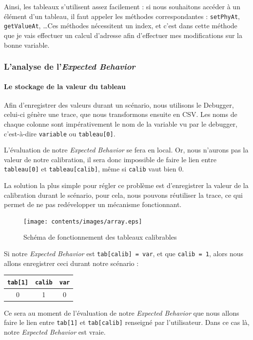 Ainsi, les tableaux s'utilisent assez facilement : si nous souhaitons accéder à un élément d'un tableau, il faut appeler les méthodes correspondantes : \texttt{setPhyAt}, \texttt{getValueAt}, \ldots Ces méthodes nécessitent un index, et c'est dans cette méthode que je vais effectuer un calcul d'adresse afin d'effectuer mes modifications sur la bonne variable.


\subsubsection{L'analyse de l'\textit{Expected Behavior}}


\paragraph{Le stockage de la valeur du tableau} Afin d'enregistrer des valeurs durant un scénario, nous utilisons le Debugger, celui-ci génère une trace, que nous transformons ensuite en CSV. Les noms de chaque colonne sont impérativement le nom de la variable vu par le debugger, c'est-à-dire \texttt{variable} ou \texttt{tableau[0]}.

L'évaluation de notre \textit{Expected Behavior} se fera en local. Or, nous n'aurons pas la valeur de notre calibration, il sera donc impossible de faire le lien entre \texttt{tableau[0]} et \texttt{tableau[calib]}, même si \texttt{calib} vaut bien 0.

La solution la plus simple pour régler ce problème est d'enregistrer la valeur de la calibration durant le scénario, pour cela, nous pouvons réutiliser la trace, ce qui permet de ne pas redévelopper un mécanisme fonctionnant. 
\begin{figure}[H]
\centering
\texttt{[image: contents/images/array.eps]}
\caption{Schéma de fonctionnement des tableaux calibrables}
\label{fig:array}
\end{figure}

\begin{exemple}
Si notre \textit{Expected Behavior} est \texttt{tab[calib] = var}, et que \texttt{calib = 1}, alors nous allons enregistrer ceci durant notre scénario : 

\begin{tabular}{ccc}
\texttt{tab[1]} & \texttt{calib} & \texttt{var}\\
\hline
0      &   1   & 0
\end{tabular}

Ce sera au moment de l'évaluation de notre \textit{Expected Behavior} que nous allons faire le lien entre \texttt{tab[1]} et \texttt{tab[calib]} renseigné par l'utilisateur. Dans ce cas là, notre \textit{Expected Behavior} est vraie.
\end{exemple}

